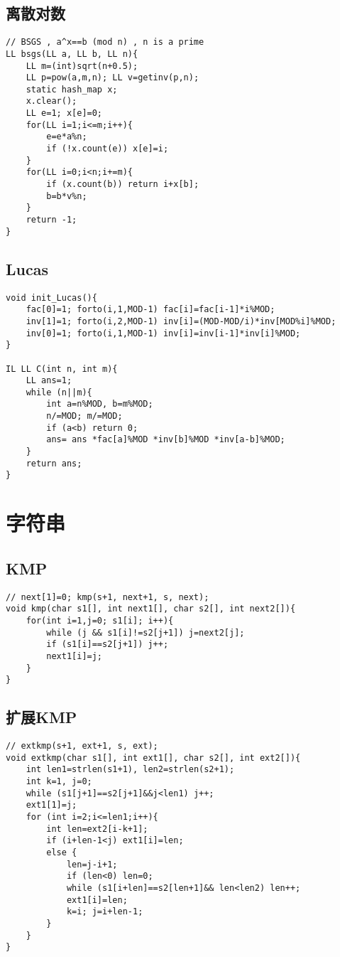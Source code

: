 \documentclass{article}
\begin{document}
\subsection{离散对数}
\begin{lstlisting}
// BSGS , a^x==b (mod n) , n is a prime
LL bsgs(LL a, LL b, LL n){
	LL m=(int)sqrt(n+0.5);
	LL p=pow(a,m,n); LL v=getinv(p,n);
	static hash_map x;
	x.clear();
	LL e=1; x[e]=0;
	for(LL i=1;i<=m;i++){
		e=e*a%n;
		if (!x.count(e)) x[e]=i;
	}
	for(LL i=0;i<n;i+=m){
		if (x.count(b)) return i+x[b];
		b=b*v%n;
	}
	return -1;
}
\end{lstlisting}

\subsection{Lucas}
\begin{lstlisting}
void init_Lucas(){
	fac[0]=1; forto(i,1,MOD-1) fac[i]=fac[i-1]*i%MOD;
	inv[1]=1; forto(i,2,MOD-1) inv[i]=(MOD-MOD/i)*inv[MOD%i]%MOD;
	inv[0]=1; forto(i,1,MOD-1) inv[i]=inv[i-1]*inv[i]%MOD;
}

IL LL C(int n, int m){
	LL ans=1;
	while (n||m){
		int a=n%MOD, b=m%MOD;
		n/=MOD; m/=MOD;
		if (a<b) return 0;
		ans= ans *fac[a]%MOD *inv[b]%MOD *inv[a-b]%MOD;
	}
	return ans;
}
\end{lstlisting}

\section{字符串}
\subsection{KMP}
\begin{lstlisting}
// next[1]=0; kmp(s+1, next+1, s, next);
void kmp(char s1[], int next1[], char s2[], int next2[]){
	for(int i=1,j=0; s1[i]; i++){
        while (j && s1[i]!=s2[j+1]) j=next2[j];
        if (s1[i]==s2[j+1]) j++;
        next1[i]=j;
    }
}
\end{lstlisting}

\subsection{扩展KMP}
\begin{lstlisting}
// extkmp(s+1, ext+1, s, ext);
void extkmp(char s1[], int ext1[], char s2[], int ext2[]){
	int len1=strlen(s1+1), len2=strlen(s2+1);
	int k=1, j=0;
	while (s1[j+1]==s2[j+1]&&j<len1) j++;
	ext1[1]=j;
	for (int i=2;i<=len1;i++){
		int len=ext2[i-k+1];
		if (i+len-1<j) ext1[i]=len;
		else {
			len=j-i+1;
			if (len<0) len=0;
			while (s1[i+len]==s2[len+1]&& len<len2) len++;
			ext1[i]=len;
			k=i; j=i+len-1;
		}
	}
}
\end{lstlisting}
\end{document}
